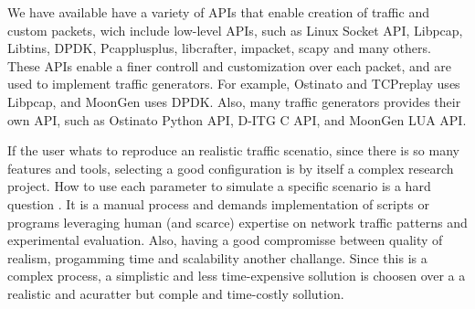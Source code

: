 We have available have a variety of APIs that enable creation of traffic and custom packets, wich include low-level APIs, such as Linux Socket API,  Libpcap, Libtins, DPDK, Pcapplusplus, libcrafter, impacket, scapy and many others. These APIs enable a finer controll and customization over each packet, and are used to implement traffic generators. For example, Ostinato and TCPreplay uses Libpcap, and MoonGen uses DPDK. Also, many traffic generators provides their own API, such as Ostinato Python API, D-ITG C API, and MoonGen LUA API. 




If the user whats to reproduce an realistic traffic scenatio, since there is so many features and tools, selecting a good configuration is by itself a complex research project. How to use each parameter to simulate a specific scenario is a hard question \cite{legotg-paper}\cite{selfsimilar-ethernet}. It is a manual process and demands implementation of scripts or programs leveraging human (and scarce) expertise on network traffic patterns and experimental evaluation. Also, having a good compromisse between quality of realism, progamming time and scalability another challange. Since this is a complex process, a simplistic and less time-expensive sollution is choosen over a a realistic and acuratter but comple and time-costly sollution. 


